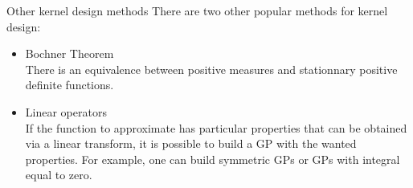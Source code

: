 \documentclass{beamer}
\begin{document}
\begin{frame}{Other kernel design methods}
There are two other popular methods for kernel design:
\begin{itemize}
    \item Bochner Theorem\\
There is an equivalence between positive measures and stationnary positive definite functions. 
    \item Linear operators\\
If the function to approximate has particular properties that can be obtained via a linear transform, it is possible to build a GP with the wanted properties. For example, one can build symmetric GPs or GPs with integral equal to zero.
\end{itemize}
\end{frame}


\end{document}
